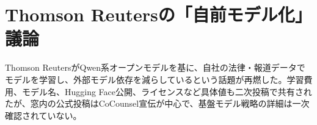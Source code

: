 \section{Thomson Reutersの「自前モデル化」議論}
Thomson ReutersがQwen系オープンモデルを基に、自社の法律・報道データでモデルを学習し、外部モデル依存を減らしているという話題が再燃した。学習費用、モデル名、Hugging Face公開、ライセンスなど具体値も二次投稿で共有されたが、窓内の公式投稿はCoCounsel宣伝が中心で、基盤モデル戦略の詳細は一次確認されていない。
